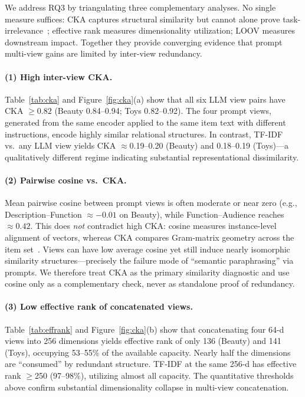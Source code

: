 \documentclass[sigconf,natbib=true,anonymous]{acmart}
\begin{document}
We address RQ3 by triangulating three complementary analyses.
No single measure suffices: CKA captures structural similarity but cannot alone prove task-irrelevance~\cite{kornblith2019cka}; effective rank measures dimensionality utilization; LOOV measures downstream impact.
Together they provide converging evidence that prompt multi-view gains are limited by inter-view redundancy.

\paragraph{(1) High inter-view CKA.}
Table~\ref{tab:cka} and Figure~\ref{fig:cka}(a) show that all six LLM view pairs have CKA $\ge 0.82$ (Beauty 0.84--0.94; Toys 0.82--0.92).
The four prompt views, generated from the same encoder applied to the same item text with different instructions, encode highly similar relational structures.
In contrast, TF-IDF vs.\ any LLM view yields CKA $\approx$0.19--0.20 (Beauty) and 0.18--0.19 (Toys)---a qualitatively different regime indicating substantial representational dissimilarity.

\paragraph{(2) Pairwise cosine vs.\ CKA.}
Mean pairwise cosine between prompt views is often moderate or near zero (e.g., Description--Function $\approx -0.01$ on Beauty), while Function--Audience reaches $\approx 0.42$.
This does \emph{not} contradict high CKA: cosine measures instance-level alignment of vectors, whereas CKA compares Gram-matrix geometry across the item set~\cite{kornblith2019cka}.
Views can have low average cosine yet still induce nearly isomorphic similarity structures---precisely the failure mode of ``semantic paraphrasing'' via prompts.
We therefore treat CKA as the primary similarity diagnostic and use cosine only as a complementary check, never as standalone proof of redundancy.

\paragraph{(3) Low effective rank of concatenated views.}
Table~\ref{tab:effrank} and Figure~\ref{fig:cka}(b) show that concatenating four 64-d views into 256 dimensions yields effective rank of only 136 (Beauty) and 141 (Toys), occupying 53--55\% of the available capacity.
Nearly half the dimensions are ``consumed'' by redundant structure.
TF-IDF at the same 256-d has effective rank $\ge$250 (97--98\%), utilizing almost all capacity.
The quantitative thresholds above confirm substantial dimensionality collapse in multi-view concatenation.
\end{document}
